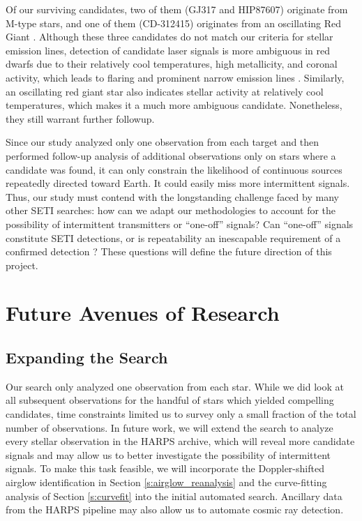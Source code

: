 \documentclass[linenumbers]{aastex631}
\begin{document}
Of our surviving candidates, two of them (GJ317 and HIP87607) originate from M-type stars, and one of them (CD-312415) originates from an oscillating Red Giant \citep{CD-312415_RED_GIANT}. Although these three candidates do not match our criteria for stellar emission lines, detection of candidate laser signals is more ambiguous in red dwarfs due to their relatively cool temperatures, high metallicity, and coronal activity, which leads to flaring and prominent narrow emission lines \citep{Marcy_2021}. Similarly, an oscillating red giant star also indicates stellar activity at relatively cool temperatures, which makes it a much more ambiguous candidate. Nonetheless, they still warrant further followup. 

Since our study analyzed only one observation from each target and then performed follow-up analysis of additional observations only on stars where a candidate was found, it can only constrain the likelihood of continuous sources repeatedly directed toward Earth.  It could easily miss more intermittent signals. Thus, our study must contend with the longstanding challenge faced by many other SETI searches: how can we adapt our methodologies to account for the possibility of intermittent transmitters or ``one-off'' signals?  Can ``one-off'' signals constitute SETI detections, or is repeatability an inescapable requirement of a confirmed detection \citep{2019nasatechnosignatures, Wow!Signal}? These questions will define the future direction of this project.


\section{Future Avenues of Research}
\subsection{Expanding the Search}
Our search only analyzed one observation from each star. While we did look at all subsequent observations for the handful of stars which yielded compelling candidates, time constraints limited us to survey only a small fraction of the total number of observations.  In future work, we will extend the search to analyze every stellar observation in the HARPS archive, which will reveal more candidate signals and may allow us to better investigate the possibility of intermittent signals. To make this task feasible, we will incorporate the Doppler-shifted airglow identification in Section \ref{s:airglow_reanalysis} and the curve-fitting analysis of Section \ref{s:curvefit} into the initial automated search. Ancillary data from the HARPS pipeline may also allow us to automate cosmic ray detection.
\end{document}
